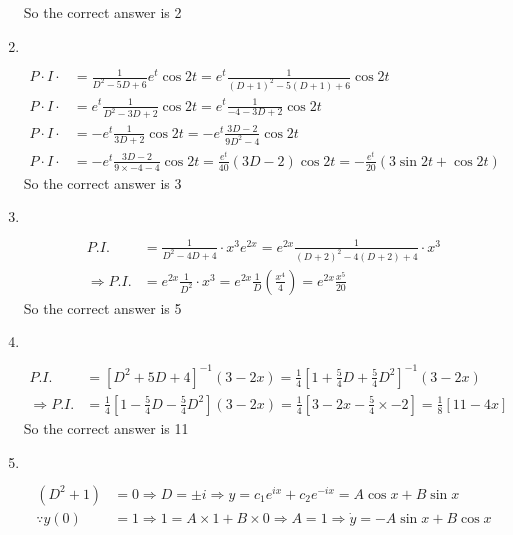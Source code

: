 \begin{enumerate}
\begin{answer}
		So the correct answer is 2
\end{answer}
		\item $\left. \right. $
		\begin{answer}
			\begin{align*}
			P \cdot I \cdot&=\frac{1}{D^{2}-5 D+6} e^{t} \cos 2 t=e^{t} \frac{1}{(D+1)^{2}-5(D+1)+6} \cos 2 t\\
			P \cdot I \cdot&=e^{t} \frac{1}{D^{2}-3 D+2} \cos 2 t=e^{t} \frac{1}{-4-3 D+2} \cos 2 t\\
			P \cdot I \cdot&=-e^{t} \frac{1}{3 D+2} \cos 2 t=-e^{t} \frac{3 D-2}{9 D^{2}-4} \cos 2 t\\
			P \cdot I \cdot&=-e^{t} \frac{3 D-2}{9 \times-4-4} \cos 2 t=\frac{e^{t}}{40}(3 D-2) \cos 2 t=-\frac{e^{t}}{20}(3 \sin 2 t+\cos 2 t)
			\end{align*}
				So the correct answer is 3
		\end{answer}
		\item $\left. \right. $
\begin{answer}
	\begin{align*}
	P . I .&=\frac{1}{D^{2}-4 D+4} \cdot x^{3} e^{2 x}=e^{2 x} \frac{1}{(D+2)^{2}-4(D+2)+4} \cdot x^{3}\\
	\Rightarrow P . I .&=e^{2 x} \frac{1}{D^{2}} \cdot x^{3}=e^{2 x} \frac{1}{D}\left(\frac{x^{4}}{4}\right)=e^{2 x} \frac{x^{5}}{20}
	\end{align*}
		So the correct answer is 5
\end{answer}
		\item $\left. \right. $
	\begin{answer}
		\begin{align*}
		 P.I. &=\left[D^{2}+5 D+4\right]^{-1}(3-2 x)=\frac{1}{4}\left[1+\frac{5}{4} D+\frac{5}{4} D^{2}\right]^{-1}(3-2 x)\\
		\Rightarrow P.I. &=\frac{1}{4}\left[1-\frac{5}{4} D-\frac{5}{4} D^{2}\right](3-2 x)=\frac{1}{4}\left[3-2 x-\frac{5}{4} \times-2\right]=\frac{1}{8}[11-4 x]
		\end{align*}
		So the correct answer is 11
	\end{answer}
		\item $\left. \right. $
	\begin{answer}
		\begin{align*}
		\left(D^{2}+1\right)&=0 \Rightarrow D=\pm i \Rightarrow y=c_{1} e^{i x}+c_{2} e^{-i x}=A \cos x+B \sin x\\
		\because y(0)&=1 \Rightarrow 1=A \times 1+B \times 0 \Rightarrow A=1 \Rightarrow \dot{y}=-A \sin x+B \cos x \\

\end{align*}
\end{answer}
\end{enumerate}
